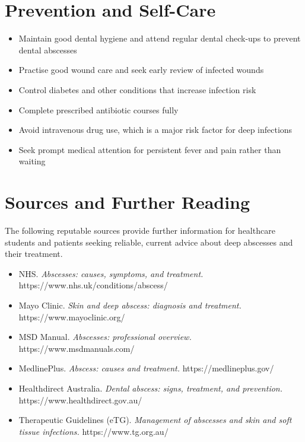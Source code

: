 \section*{Prevention and Self-Care}
\begin{itemize}
    \item Maintain good dental hygiene and attend regular dental check-ups to prevent dental abscesses
    \item Practise good wound care and seek early review of infected wounds
    \item Control diabetes and other conditions that increase infection risk
    \item Complete prescribed antibiotic courses fully
    \item Avoid intravenous drug use, which is a major risk factor for deep infections
    \item Seek prompt medical attention for persistent fever and pain rather than waiting
\end{itemize}

\section*{Sources and Further Reading}
The following reputable sources provide further information for healthcare students and patients seeking reliable, current advice about deep abscesses and their treatment.

\begin{itemize}
    \item NHS. \textit{Abscesses: causes, symptoms, and treatment.} https://www.nhs.uk/conditions/abscess/
    \item Mayo Clinic. \textit{Skin and deep abscess: diagnosis and treatment.} https://www.mayoclinic.org/
    \item MSD Manual. \textit{Abscesses: professional overview.} https://www.msdmanuals.com/
    \item MedlinePlus. \textit{Abscess: causes and treatment.} https://medlineplus.gov/
    \item Healthdirect Australia. \textit{Dental abscess: signs, treatment, and prevention.} https://www.healthdirect.gov.au/
    \item Therapeutic Guidelines (eTG). \textit{Management of abscesses and skin and soft tissue infections.} https://www.tg.org.au/
\end{itemize}
